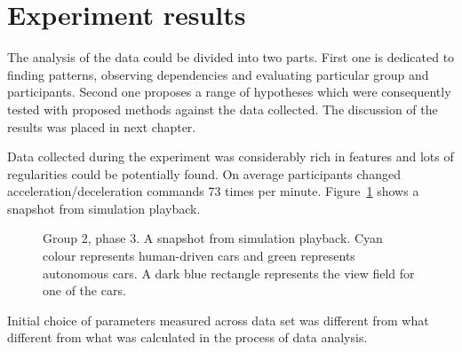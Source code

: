 \documentclass[11pt,english]{article}
\begin{document}
\section{Experiment results}



The analysis of the data could be divided into two parts. First one is dedicated to finding patterns, observing dependencies and evaluating particular group and participants. Second one proposes a range of hypotheses which were consequently tested with proposed methods against the data collected. The discussion of the results was placed in next chapter.


Data collected during the experiment was considerably rich in features and lots of regularities could be potentially found. On average participants changed acceleration/deceleration commands 73 times per minute. 
Figure~\ref{fig:sample_snapshot} shows a snapshot from simulation playback.  
 
 
\begin{figure}[h] %
\caption{Group 2, phase 3. A snapshot from simulation playback. Cyan colour represents human-driven cars and green represents autonomous cars. A dark blue rectangle represents the view field for one of the cars.}
\label{fig:sample_snapshot}
\end{figure} 
 
Initial choice of parameters measured across data set was different from what different from what was calculated in the process of data analysis.
\end{document}

